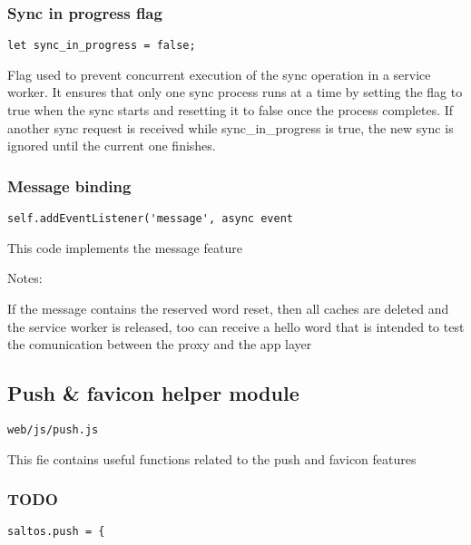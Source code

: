 \documentclass[a4paper]{article}
\begin{document}
\hypertarget{toc833}{}
\subsubsection{Sync in progress flag}

\begin{lstlisting}
let sync_in_progress = false;
\end{lstlisting}

Flag used to prevent concurrent execution of the sync operation in a service worker.
It ensures that only one sync process runs at a time by setting the flag to true
when the sync starts and resetting it to false once the process completes. If another
sync request is received while sync\_in\_progress is true, the new sync is ignored
until the current one finishes.

\hypertarget{toc834}{}
\subsubsection{Message binding}

\begin{lstlisting}
self.addEventListener('message', async event
\end{lstlisting}

This code implements the message feature

Notes:

If the message contains the reserved word reset, then all caches are deleted
and the service worker is released, too can receive a hello word that is intended
to test the comunication between the proxy and the app layer

\hypertarget{toc835}{}
\subsection{Push \& favicon helper module}

\begin{lstlisting}
web/js/push.js
\end{lstlisting}

This fie contains useful functions related to the push and favicon features

\hypertarget{toc836}{}
\subsubsection{TODO}

\begin{lstlisting}
saltos.push = {
\end{lstlisting}
\end{document}
